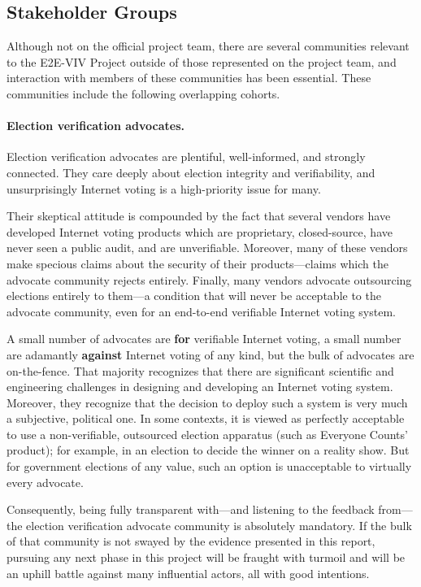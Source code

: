 \subsection{Stakeholder Groups}
\label{sec:stakeholder-groups}

Although not on the official project team, there are several
communities relevant to the E2E-VIV Project outside of those
represented on the project team, and interaction with members of these
communities has been essential. These communities include the
following overlapping cohorts.

\paragraph{Election verification advocates.} Election verification
advocates are plentiful, well-informed, and strongly connected.  They
care deeply about election integrity and verifiability, and
unsurprisingly Internet voting is a high-priority issue for many.

Their skeptical attitude is compounded by the fact that several vendors
have developed Internet voting products which are proprietary,
closed-source, have never seen a public audit, and are
unverifiable. Moreover, many of these vendors make specious claims
about the security of their products---claims which the advocate
community rejects entirely. Finally, many vendors advocate outsourcing
elections entirely to them---a condition that will never be acceptable
to the advocate community, even for an end-to-end verifiable Internet
voting system.

A small number of advocates are \textbf{for} verifiable Internet
voting, a small number are adamantly \textbf{against} Internet voting
of any kind, but the bulk of advocates are on-the-fence. That majority
recognizes that there are significant scientific and engineering
challenges in designing and developing an Internet voting system.
Moreover, they recognize that the decision to deploy such a system is
very much a subjective, political one. In some contexts, it is viewed
as perfectly acceptable to use a non-verifiable, outsourced election
apparatus (such as Everyone Counts' product); for example, in an election
to decide the winner on a reality show. But for government elections
of any value, such an option is unacceptable to virtually every
advocate.

Consequently, being fully transparent with---and listening to the
feedback from---the election verification advocate community is
absolutely mandatory. If the bulk of that community is not swayed by
the evidence presented in this report, pursuing any next phase in this
project will be fraught with turmoil and will be an uphill battle
against many influential actors, all with good intentions.

